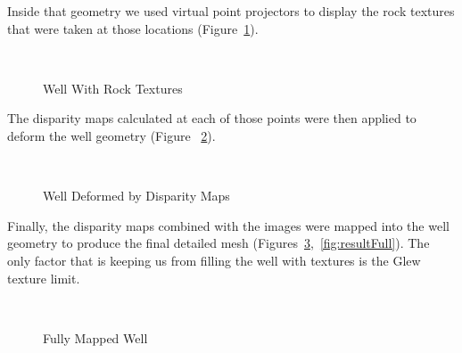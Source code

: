 \documentclass[a4paper,twoside]{article}
\begin{document}
Inside that geometry we used virtual point projectors to display the rock textures that were taken at those locations (Figure~\ref{fig:result2}).

\begin{figure}[!h]
	\centering
		\quad %
		\\%
		\caption{Well With Rock Textures}
		\label{fig:result2}
\end{figure}

  The disparity maps calculated at each of those points were then applied to deform the well geometry (Figure ~\ref{fig:result3}).

\begin{figure}[!h]
	\centering
		\quad %
		\\%
		\caption{Well Deformed by Disparity Maps}
		\label{fig:result3}
\end{figure}

Finally, the disparity maps combined with the images were mapped into the well geometry to produce the final detailed mesh (Figures~\ref{fig:result4},~\ref{fig:resultFull}).  The only factor that is keeping us from filling the well with textures is the Glew texture limit. 

\begin{figure}[!h]
	\centering
		\quad %
		\\%
		\medskip
		\caption{Fully Mapped Well}
		\label{fig:result4}
\end{figure}

\begin{figure*}[!ht]
   \vspace{-0.2cm}
   \caption{Full Displaced Well}
  \label{fig:resultFull}
 \end{figure*}
\end{document}
